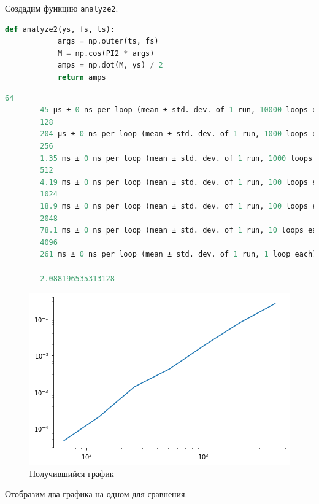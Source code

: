 \documentclass[a4paper, 14pt]{extarticle}
\begin{document}
    Создадим функцию \texttt{analyze2}.

    \begin{lstlisting}[language=Python, caption= Функция analyze2, label={lst:analyze2}]
        def analyze2(ys, fs, ts):
            args = np.outer(ts, fs)
            M = np.cos(PI2 * args)
            amps = np.dot(M, ys) / 2
            return amps
    \end{lstlisting}

    \begin{lstlisting}[language=Python, caption= Получившиеся данные, label={lst:data_2}]
        64
        45 µs ± 0 ns per loop (mean ± std. dev. of 1 run, 10000 loops each)
        128
        204 µs ± 0 ns per loop (mean ± std. dev. of 1 run, 1000 loops each)
        256
        1.35 ms ± 0 ns per loop (mean ± std. dev. of 1 run, 1000 loops each)
        512
        4.19 ms ± 0 ns per loop (mean ± std. dev. of 1 run, 100 loops each)
        1024
        18.9 ms ± 0 ns per loop (mean ± std. dev. of 1 run, 100 loops each)
        2048
        78.1 ms ± 0 ns per loop (mean ± std. dev. of 1 run, 10 loops each)
        4096
        261 ms ± 0 ns per loop (mean ± std. dev. of 1 run, 1 loop each)

        2.088196535313128
    \end{lstlisting}

    \begin{figure}[H]
        \centering
        \includegraphics[width=0.8\linewidth]{analyze_2_wave}
        \caption{Получившийся график}
        \label{fig:analyze_2_wave}
    \end{figure}

    Отобразим два графика на одном для сравнения.
\end{document}
